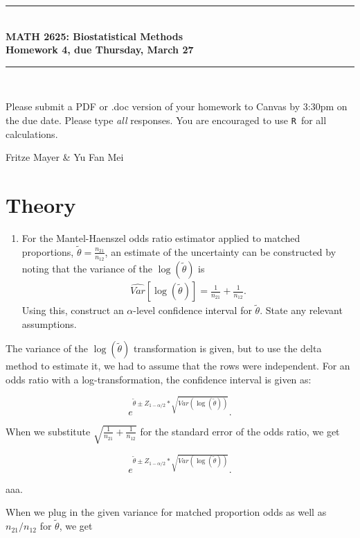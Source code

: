 \documentclass{article}
\newcommand{\HRule}{\rule{\linewidth}{0.5mm}}
\newcommand{\R}{\texttt{R}}
\begin{document}
	\begin{center}
		\HRule \\[0.1cm]
		\vspace{0.1cm}
		{ \LARGE \bfseries MATH 2625: Biostatistical Methods\\[0.5cm] Homework 4, due Thursday, March 27 } \\[0.1cm]
		\HRule \\[0.1cm]
	\end{center}
	
		Please submit a PDF or .doc version of your homework to Canvas by 3:30pm on the due date. Please type \emph{all} responses. You are encouraged to use \R\ for all calculations.

		Fritze Mayer \& Yu Fan Mei
		
	\section*{Theory}
	\begin{enumerate}
		\item For the Mantel-Haenszel odds ratio estimator applied to matched proportions, $\tilde{\theta} = \frac{n_{21}}{n_{12}}$, an estimate of the uncertainty can be constructed by noting that the variance of the $\log(\tilde{\theta})$ is
		\begin{align*}
			\widehat{Var}\left[\log(\tilde{\theta})\right] = \frac{1}{n_{21}} + \frac{1}{n_{12}}.
		\end{align*}
		Using this, construct an $\alpha$-level confidence interval for $\tilde{\theta}$. State any relevant assumptions.
	\end{enumerate}

	The variance of the $\log(\tilde{\theta})$ transformation is given, but to use the delta method to estimate it, we had to assume that the rows were independent. For an odds ratio with a log-transformation, the confidence interval is given as:

	$$e^{\tilde{\theta} \pm Z_{1 - \alpha/2} * \sqrt{Var(\log(\tilde{\theta})) }}.$$

	When we substitute $\sqrt{\frac{1}{n_{21}} + \frac{1}{n_{12}}}$ for the standard error of the odds ratio, we get 

	$$e^{\tilde{\theta} \pm Z_{1 - \alpha/2} * \sqrt{Var(\log(\tilde{\theta})) }}.$$


	


	aaa.


	When we plug in the given variance for matched proportion odds as well as $n_{21} / n_{12}$ for $\tilde{\theta}$, we get
\end{document}
